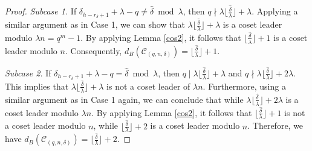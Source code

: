 \documentclass[journal,onecolumn]{IEEEtran}
\begin{document}
\begin{proof}
\textit{Subcase 1.} If $\delta_{h-r_{\delta}+1}+\lambda-q\neq \hat{\delta} \bmod \lambda$, then $q\nmid \lambda\lfloor \frac{\hat{\delta}}{\lambda}\rfloor+\lambda$. Applying a similar argument as in Case 1, we can show that $\lambda \lfloor \frac{\hat{\delta}}{\lambda}\rfloor+\lambda$ is a coset leader modulo $\lambda n=q^m-1$.  By applying Lemma \ref{cos2}, it follows that $\lfloor \frac{\hat{\delta}}{\lambda}\rfloor+1$ is a coset leader modulo $n$. Consequently, $d_B(\mathcal{C}_{(q,n,\delta)}) =\lfloor \frac{\hat{\delta}}{\lambda}\rfloor+1.$


\textit{Subcase 2.}
 If $\delta_{h-r_{\delta}+1}+\lambda -q= \hat{\delta} \bmod \lambda$, then $q\mid \lambda \lfloor \frac{\hat{\delta}}{\lambda}\rfloor+\lambda$ and $q\nmid \lambda \lfloor \frac{\hat{\delta}}{\lambda}\rfloor+2\lambda $. This implies that $\lambda \lfloor \frac{\hat{\delta}}{\lambda}\rfloor+\lambda $ is not a coset leader of $\lambda n$. Furthermore, using a similar argument as in Case 1 again, we can conclude that  while $\lambda\lfloor \frac{\hat{\delta}}{\lambda}\rfloor+2\lambda $ is a coset leader modulo $\lambda  n$. By applying Lemma \ref{cos2}, it follows that  $\lfloor \frac{\hat{\delta}}{\lambda}\rfloor+1$ is not a coset leader modulo $n$, while $\lfloor \frac{\hat{\delta}}{\lambda}\rfloor+2$ is  a coset leader modulo $n$. Therefore, we have  $d_B(\mathcal{C}_{(q,n,\delta)}) =\lfloor \frac{\hat{\delta}}{\lambda}\rfloor+2.$
 \end{proof}
\end{document}
